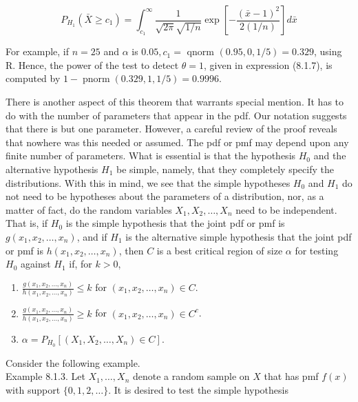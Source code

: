 \begin{equation*}
P_{H_{1}}\left(\bar{X} \geq c_{1}\right)=\int_{c_{1}}^{\infty} \frac{1}{\sqrt{2 \pi} \sqrt{1 / n}} \exp \left[-\frac{(\bar{x}-1)^{2}}{2(1 / n)}\right] d \bar{x} \tag{8.1.7}
\end{equation*}


For example, if $n=25$ and $\alpha$ is $0.05, c_{1}=$ qnorm $(0.95,0,1 / 5)=0.329$, using R. Hence, the power of the test to detect $\theta=1$, given in expression (8.1.7), is computed by $1-\operatorname{pnorm}(0.329,1,1 / 5)=0.9996$.

There is another aspect of this theorem that warrants special mention. It has to do with the number of parameters that appear in the pdf. Our notation suggests that there is but one parameter. However, a careful review of the proof reveals that nowhere was this needed or assumed. The pdf or pmf may depend upon any finite number of parameters. What is essential is that the hypothesis $H_{0}$ and the alternative hypothesis $H_{1}$ be simple, namely, that they completely specify the distributions. With this in mind, we see that the simple hypotheses $H_{0}$ and $H_{1}$ do not need to be hypotheses about the parameters of a distribution, nor, as a matter of fact, do the random variables $X_{1}, X_{2}, \ldots, X_{n}$ need to be independent. That is, if $H_{0}$ is the simple hypothesis that the joint pdf or pmf is $g\left(x_{1}, x_{2}, \ldots, x_{n}\right)$, and if $H_{1}$ is the alternative simple hypothesis that the joint pdf or pmf is $h\left(x_{1}, x_{2}, \ldots, x_{n}\right)$, then $C$ is a best critical region of size $\alpha$ for testing $H_{0}$ against $H_{1}$ if, for $k>0$,

\begin{enumerate}
  \item $\frac{g\left(x_{1}, x_{2}, \ldots, x_{n}\right)}{h\left(x_{1}, x_{2}, \ldots, x_{n}\right)} \leq k$ for $\left(x_{1}, x_{2}, \ldots, x_{n}\right) \in C$.
  \item $\frac{g\left(x_{1}, x_{2}, \ldots, x_{n}\right)}{h\left(x_{1}, x_{2}, \ldots, x_{n}\right)} \geq k$ for $\left(x_{1}, x_{2}, \ldots, x_{n}\right) \in C^{c}$.
  \item $\alpha=P_{H_{0}}\left[\left(X_{1}, X_{2}, \ldots, X_{n}\right) \in C\right]$.
\end{enumerate}

Consider the following example.\\
Example 8.1.3. Let $X_{1}, \ldots, X_{n}$ denote a random sample on $X$ that has pmf $f(x)$ with support $\{0,1,2, \ldots\}$. It is desired to test the simple hypothesis

